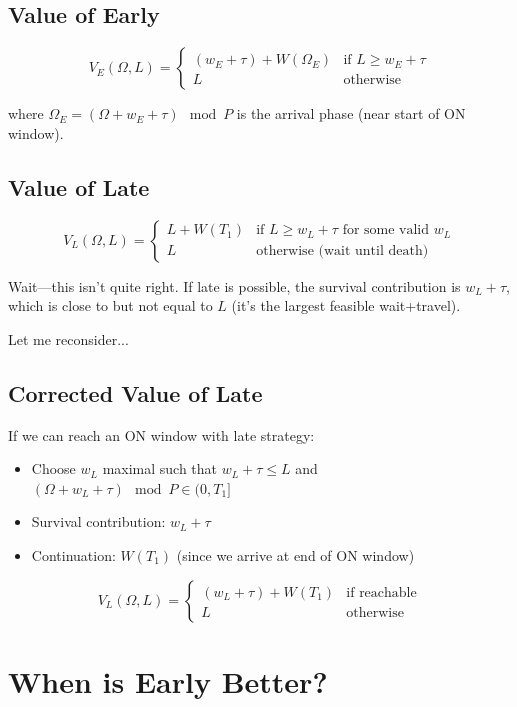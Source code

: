 \documentclass{article}
\begin{document}
\subsection{Value of Early}

\[
V_E(\Omega, L) = \begin{cases}
(w_E + \tau) + W(\Omega_E) & \text{if } L \geq w_E + \tau \\
L & \text{otherwise}
\end{cases}
\]

where $\Omega_E = (\Omega + w_E + \tau) \mod P$ is the arrival phase (near start of ON window).

\subsection{Value of Late}

\[
V_L(\Omega, L) = \begin{cases}
L + W(T_1) & \text{if } L \geq w_L + \tau \text{ for some valid } w_L \\
L & \text{otherwise (wait until death)}
\end{cases}
\]

Wait—this isn't quite right. If late is possible, the survival contribution is $w_L + \tau$, which is close to but not equal to $L$ (it's the largest feasible wait+travel).

Let me reconsider...

\subsection{Corrected Value of Late}

If we can reach an ON window with late strategy:
\begin{itemize}
    \item Choose $w_L$ maximal such that $w_L + \tau \leq L$ and $(\Omega + w_L + \tau) \mod P \in (0, T_1]$
    \item Survival contribution: $w_L + \tau$
    \item Continuation: $W(T_1)$ (since we arrive at end of ON window)
\end{itemize}

\[
V_L(\Omega, L) = \begin{cases}
(w_L + \tau) + W(T_1) & \text{if reachable} \\
L & \text{otherwise}
\end{cases}
\]

\section{When is Early Better?}
\end{document}
